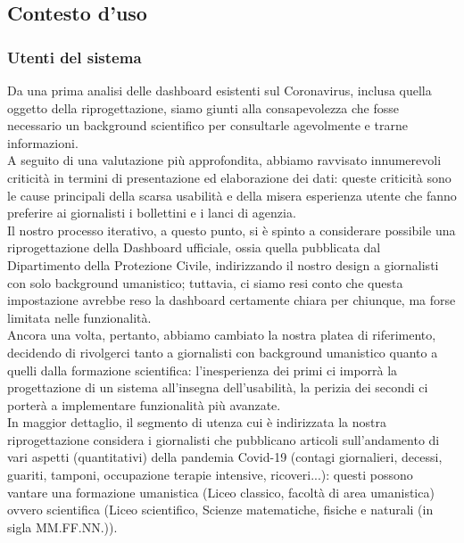 \subsection{Contesto d'uso}
\subsubsection{Utenti del sistema}
Da una prima analisi delle dashboard esistenti sul Coronavirus, inclusa quella oggetto della riprogettazione, siamo giunti alla consapevolezza che fosse necessario un background scientifico per consultarle agevolmente e trarne informazioni.\\
A seguito di una valutazione più approfondita, abbiamo ravvisato innumerevoli criticità in termini di presentazione ed elaborazione dei dati: queste criticità sono le cause principali della scarsa usabilità e della misera esperienza utente che  fanno preferire ai giornalisti i bollettini e i lanci di agenzia.\\
Il nostro processo iterativo, a questo punto, si è spinto a considerare possibile una riprogettazione della Dashboard ufficiale, ossia quella pubblicata dal Dipartimento della Protezione Civile, indirizzando il nostro design a giornalisti con solo background umanistico; tuttavia, ci siamo resi conto che questa impostazione avrebbe reso la dashboard certamente chiara per chiunque, ma forse limitata nelle funzionalità.\\ 
Ancora una volta, pertanto, abbiamo cambiato la nostra platea di riferimento, decidendo di rivolgerci tanto a giornalisti con background umanistico quanto a quelli dalla formazione scientifica: l'inesperienza dei primi ci imporrà la progettazione di un sistema all'insegna dell'usabilità, la perizia dei secondi ci porterà a implementare funzionalità più avanzate.\\
In maggior dettaglio, il segmento di utenza cui è indirizzata la nostra riprogettazione considera i giornalisti che pubblicano articoli sull'andamento di vari aspetti (quantitativi) della pandemia Covid-19 (contagi giornalieri, decessi, guariti, tamponi, occupazione terapie intensive, ricoveri...): questi possono vantare una formazione umanistica (Liceo classico, facoltà di area umanistica) ovvero scientifica (Liceo scientifico, Scienze matematiche, fisiche e naturali (in sigla MM.FF.NN.)).

